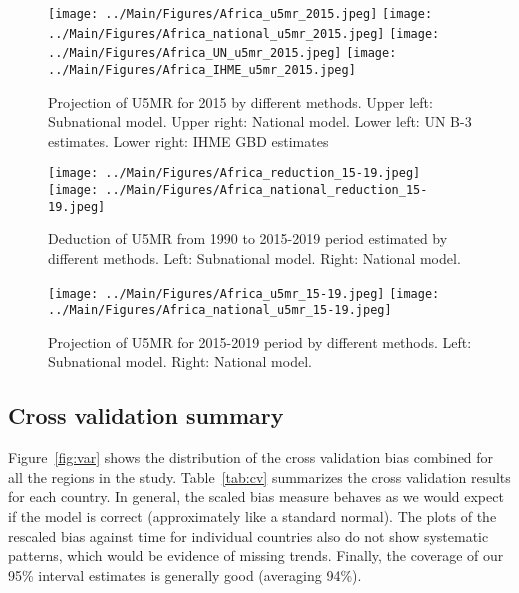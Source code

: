 \documentclass[12pt]{article}\usepackage[]{graphicx}\usepackage[]{color}
\begin{document}
\begin{figure}[htb]
\texttt{[image: ../Main/Figures/Africa\_u5mr\_2015.jpeg]}
\texttt{[image: ../Main/Figures/Africa\_national\_u5mr\_2015.jpeg]}
\texttt{[image: ../Main/Figures/Africa\_UN\_u5mr\_2015.jpeg]}
\texttt{[image: ../Main/Figures/Africa\_IHME\_u5mr\_2015.jpeg]}
\caption{Projection of U5MR for 2015 by different methods. Upper left: Subnational model. Upper right: National model. Lower left: UN B-3 estimates. Lower right: IHME GBD estimates}
\label{fig:c1-2}
\end{figure}


\begin{figure}[htb]
\texttt{[image: ../Main/Figures/Africa\_reduction\_15-19.jpeg]}
\texttt{[image: ../Main/Figures/Africa\_national\_reduction\_15-19.jpeg]}
\caption{Deduction of U5MR from 1990 to 2015-2019 period estimated by different methods. Left: Subnational model. Right: National model.}
\label{fig:c1-3}
\end{figure}

\begin{figure}[htb]
\texttt{[image: ../Main/Figures/Africa\_u5mr\_15-19.jpeg]}
\texttt{[image: ../Main/Figures/Africa\_national\_u5mr\_15-19.jpeg]}
\caption{Projection of U5MR for 2015-2019 period by different methods. Left: Subnational model. Right: National model.}
\label{fig:c1-4}
\end{figure}

\clearpage
\subsection{Cross validation summary}
Figure~\ref{fig:var} shows the distribution of the cross validation bias combined for all the regions in the study. Table~\ref{tab:cv} summarizes the cross validation results for each country. In general, the scaled bias measure behaves as we would expect if the model is correct (approximately like a standard normal). The plots of the rescaled bias against time for individual countries also do not show systematic patterns, which would be evidence of missing trends. Finally, the coverage of our 95\% interval estimates is generally good (averaging 94\%).
\end{document}
